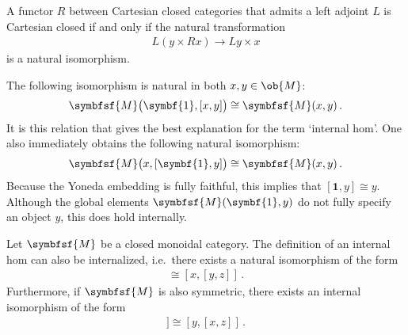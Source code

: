     \begin{property}
        A functor $R$ between Cartesian closed categories that admits a left adjoint $L$ is Cartesian closed if and only if the natural transformation
        \begin{gather}
            L(y\times Rx)\rightarrow Ly\times x
        \end{gather}
        is a natural isomorphism.
    \end{property}

    \begin{property}\label{cat:internal_hom_property}
        The following isomorphism is natural in both $x,y\in\ob{M}$:
        \begin{gather}
            \symbfsf{M}\bigl(\symbf{1},[x,y]\bigr)\cong\symbfsf{M}(x,y)\,.
        \end{gather}
        It is this relation that gives the best explanation for the term `internal hom'. One also immediately obtains the following natural isomorphism:
        \begin{gather}
            \symbfsf{M}\bigl(x,[\symbf{1},y]\bigr)\cong\symbfsf{M}(x,y)\,.
        \end{gather}
        Because the Yoneda embedding is fully faithful, this implies that $[\symbf{1},y]\cong y$. Although the global elements $\symbfsf{M}(\symbf{1},y)$ do not fully specify an object $y$, this does hold internally.
    \end{property}

    \begin{property}[Symmetry]\label{cat:internal_symmetry}
        Let $\symbfsf{M}$ be a closed monoidal category. The definition of an internal hom can also be internalized, i.e.~there exists a natural isomorphism of the form
        \begin{gather}
            [x\otimes y,z]\cong[x,[y,z]]\,.
        \end{gather}
        Furthermore, if $\symbfsf{M}$ is also symmetric, there exists an internal isomorphism of the form
        \begin{gather}
            [x,[y,z]]\cong[y,[x,z]]\,.
        \end{gather}
    \end{property}

